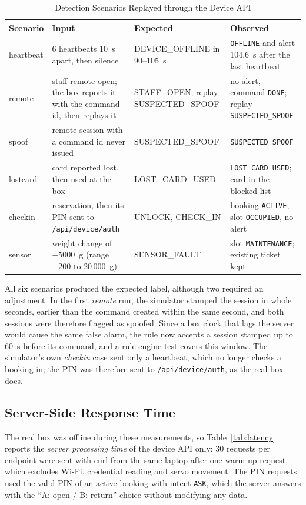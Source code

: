 \begin{table}[t]
\renewcommand{\arraystretch}{1.1}
\centering
\small
\caption{Detection Scenarios Replayed through the Device API}
\label{tab:scen}
\begin{tabular}{l p{5.0cm} p{3.0cm} p{5.8cm}}
\toprule
Scenario & Input & Expected & Observed \\
\midrule
heartbeat & 6 heartbeats 10~s apart, then silence & DEVICE\_OFFLINE in 90--105~s & \texttt{OFFLINE} and alert 104.6~s after the last heartbeat \\
remote    & staff remote open; the box reports it with the command id, then replays it & STAFF\_OPEN; replay SUSPECTED\_SPOOF & no alert, command \texttt{DONE}; replay \texttt{SUSPECTED\_SPOOF} \\
spoof     & remote session with a command id never issued & SUSPECTED\_SPOOF & \texttt{SUSPECTED\_SPOOF} \\
lostcard  & card reported lost, then used at the box & LOST\_CARD\_USED & \texttt{LOST\_CARD\_USED}; card in the blocked list \\
checkin   & reservation, then its PIN sent to \texttt{/api/device/auth} & UNLOCK, CHECK\_IN & booking \texttt{ACTIVE}, slot \texttt{OCCUPIED}, no alert \\
sensor    & weight change of $-5000$~g (range $-200$ to 20\,000~g) & SENSOR\_FAULT & slot \texttt{MAINTENANCE}; existing ticket kept \\
\bottomrule
\end{tabular}
\end{table}

All six scenarios produced the expected label, although two required an adjustment. In the first \emph{remote} run, the
simulator stamped the session in whole seconds, earlier than the command created within the same second, and both
sessions were therefore flagged as spoofed. Since a box clock that lags the server would cause the same false alarm,
the rule now accepts a session stamped up to 60~s before its command, and a rule-engine test covers this window. The
simulator's own \emph{checkin} case sent only a heartbeat, which no longer checks a booking in; the PIN was therefore
sent to \texttt{/api/device/auth}, as the real box does.

\subsection{Server-Side Response Time}
\label{sec:latency}

The real box was offline during these measurements, so Table~\ref{tab:latency} reports the \emph{server processing
time} of the device API only: 30 requests per endpoint were sent with curl from the same laptop after one warm-up
request, which excludes Wi-Fi, credential reading and servo movement. The PIN requests used the valid PIN of an active
booking with intent \texttt{ASK}, which the server answers with the ``A: open / B: return'' choice without modifying
any data.

